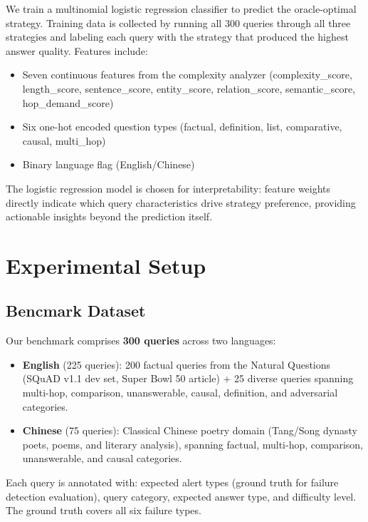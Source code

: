 \documentclass[11pt,a4paper]{article}
\begin{document}
We train a multinomial logistic regression classifier to predict the oracle-optimal strategy. Training data is collected by running all 300 queries through all three strategies and labeling each query with the strategy that produced the highest answer quality. Features include:
\begin{itemize}[leftmargin=*,itemsep=1pt]
\item Seven continuous features from the complexity analyzer (complexity\_score, length\_score, sentence\_score, entity\_score, relation\_score, semantic\_score, hop\_demand\_score)
\item Six one-hot encoded question types (factual, definition, list, comparative, causal, multi\_hop)
\item Binary language flag (English/Chinese)
\end{itemize}

The logistic regression model is chosen for interpretability: feature weights directly indicate which query characteristics drive strategy preference, providing actionable insights beyond the prediction itself.

\section{Experimental Setup}

\subsection{Bencmark Dataset}

Our benchmark comprises \textbf{300 queries} across two languages:
\begin{itemize}[leftmargin=*,itemsep=1pt]
\item \textbf{English} (225 queries): 200 factual queries from the Natural Questions (SQuAD v1.1 dev set, Super Bowl 50 article) + 25 diverse queries spanning multi-hop, comparison, unanswerable, causal, definition, and adversarial categories.
\item \textbf{Chinese} (75 queries): Classical Chinese poetry domain (Tang/Song dynasty poets, poems, and literary analysis), spanning factual, multi-hop, comparison, unanswerable, and causal categories.
\end{itemize}

Each query is annotated with: expected alert types (ground truth for failure detection evaluation), query category, expected answer type, and difficulty level. The ground truth covers all six failure types.
\end{document}
